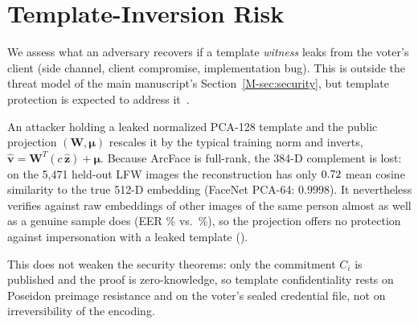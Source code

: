 \documentclass[10pt,letterpaper,journal]{IEEEtran}
\begin{document}
\section{Template-Inversion Risk}
\label{sec:supp-inversion}

We assess what an adversary recovers if a template \emph{witness} leaks from the voter's client (side channel, client compromise, implementation bug). This is outside the threat model of the main manuscript's Section~\ref{M-sec:security}, but template protection is expected to address it~\cite{ISO24745}.

An attacker holding a leaked normalized PCA-128 template and the public projection $(\mathbf{W}, \boldsymbol{\mu})$ rescales it by the typical training norm and inverts, $\hat{\mathbf{v}} = \mathbf{W}^T(c\,\hat{\mathbf{z}}) + \boldsymbol{\mu}$. Because ArcFace is full-rank, the 384-D complement is lost: on the 5,471 held-out LFW images the reconstruction has only $0.72$ mean cosine similarity to the true 512-D embedding (FaceNet PCA-64: $0.9998$). It nevertheless verifies against raw embeddings of other images of the same person almost as well as a genuine sample does (EER \nInvEer\% vs.\ \nInvRawEer\%), so the projection offers no protection against impersonation with a leaked template ().

This does not weaken the security theorems: only the commitment $C_i$ is published and the proof is zero-knowledge, so template confidentiality rests on Poseidon preimage resistance and on the voter's sealed credential file, not on irreversibility of the encoding.



\end{document}
